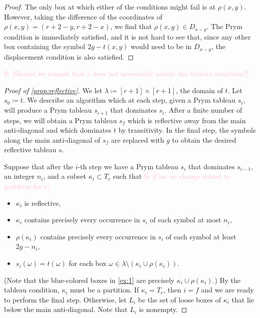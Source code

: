 \documentclass[11pt,reqno]{amsart}
\newcommand{\steven}[1]{\textcolor{pink}{\sf S: [#1]}}
\theoremstyle{definition}
\theoremstyle{problem}
\theoremstyle{plain}
\theoremstyle{remark}
\theoremstyle{theorem}
\numberwithin{equation}{section}
\numberwithin{figure}{section}
\begin{document}
\begin{proof}
  The only box at which either of the conditions might fail is at
  $\rho(x,y)$.  However, taking the difference of the coordinates of
  $\rho(x,y) = (r+2-y,r+2-x)$, we find that $\rho(x,y) \in D_{x-y}$.
  The Prym condition is immediately satisfied, and it is not hard to
  see that, since any other box containing the symbol $2g - t(x,y)$
  would need to be in $D_{x-y}$, the displacement condition is also
  satisfied.
\end{proof}

\steven{Should we remark that $s$ does not necessarily satisfy the tableau condition?}

\begin{proof}[Proof of \cref{prop:reflective}]
  We let $\lambda \coloneq [r+1]\times[r+1]$, the domain of $t$.  Let
  $s_0 \coloneq t$. We describe an algorithm which at each step, given
  a Prym tableau $s_i$, will produce a Prym tableau $s_{i+1}$ that
  dominates $s_i$. After a finite number of steps, we will obtain a
  Prym tableau $s_f$ which is reflective away from the main
  anti-diagonal and which dominates $t$ by transitivity.  In the final
  step, the symbols along the main anti-diagonal of $s_f$ are replaced
  with $g$ to obtain the desired reflective tableau $s$.

  Suppose that after the $i$-th step we have a Prym tableau $s_i$ that
  dominates $s_{i-1}$, an integer $n_i$, and a subset
  $\kappa_i \subset T_r$ such that \steven{Can we change subset to partition for $\kappa$}
  \begin{itemize}
  \item $\kappa_i$ is reflective,
  \item $\kappa_i$ contains precisely every occurrence in $s_i$ of each
    symbol at most $n_i$,
  \item $\rho(\kappa_i)$ contains precisely every occurrence in $s_i$
    of each symbol at least $2g-n_i$,
  \item $s_i(\omega) = t(\omega)$ for each box
    $\omega \in \lambda \setminus (\kappa_i \cup \rho(\kappa_i))$.
  \end{itemize}
  (Note that the blue-colored boxes in \cref{ex:1} are precisely
  $\kappa_i \cup \rho(\kappa_i)$.)  By the tableau condition,
  $\kappa_i$ must be a partition.  If $\kappa_i = T_r$, then $i = f$
  and we are ready to perform the final step.  Otherwise, let $L_i$ be
  the set of loose boxes of $\kappa_i$ that lie below the main
  anti-diagonal.  Note that $L_i$ is nonempty.


\end{proof}
\end{document}
